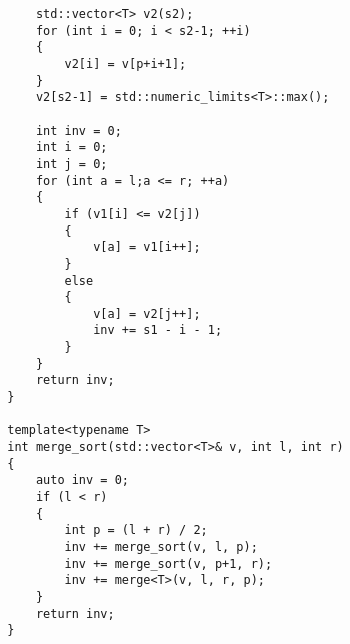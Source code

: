 \documentclass[11pt]{article}
\begin{document}
\begin{enumerate}[label=\alph*)]
\begin{lstlisting}
            std::vector<T> v2(s2);
            for (int i = 0; i < s2-1; ++i)
            {
                v2[i] = v[p+i+1];
            }
            v2[s2-1] = std::numeric_limits<T>::max();
            
            int inv = 0;
            int i = 0;
            int j = 0;
            for (int a = l;a <= r; ++a)
            {
                if (v1[i] <= v2[j])
                {
                    v[a] = v1[i++];
                }
                else
                {
                    v[a] = v2[j++];
                    inv += s1 - i - 1;
                }
            }
            return inv;
        }

        template<typename T>
        int merge_sort(std::vector<T>& v, int l, int r)
        {
            auto inv = 0;
            if (l < r)
            {
                int p = (l + r) / 2;
                inv += merge_sort(v, l, p);
                inv += merge_sort(v, p+1, r);
                inv += merge<T>(v, l, r, p);
            }
            return inv;
        }
        \end{lstlisting}
\end{enumerate} 
\end{document}
